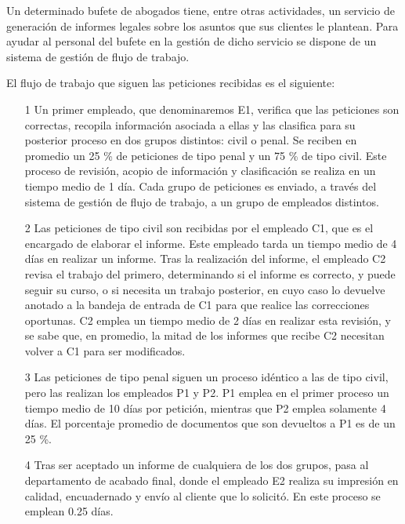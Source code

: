 \begin{problem}[21]
Un determinado bufete de abogados tiene, entre otras actividades, un servicio de generación de informes legales sobre los asuntos que sus clientes le plantean. Para ayudar al personal del bufete en la gestión de dicho servicio se dispone de un sistema de gestión de flujo de trabajo.

El flujo de trabajo que siguen las peticiones recibidas es el siguiente:
\begin{enumerate}
\item[1] Un primer empleado, que denominaremos E1, verifica que las peticiones son correctas, recopila información asociada a ellas y las clasifica para su posterior proceso en dos grupos distintos: civil o penal. Se reciben en promedio un 25 \% de peticiones de tipo penal y un 75 \% de tipo civil. Este proceso de revisión, acopio de información y clasificación se realiza en un tiempo medio de 1 día. Cada grupo de peticiones es enviado, a través del sistema de gestión de flujo de trabajo, a un grupo de empleados distintos.

\item[2] Las peticiones de tipo civil son recibidas por el empleado C1, que es el encargado de elaborar el informe. Este empleado tarda un tiempo medio de 4 días en realizar un informe. Tras la realización del informe, el empleado C2 revisa el trabajo del primero, determinando si el informe es correcto, y puede seguir su curso, o si necesita un trabajo posterior, en cuyo caso lo devuelve anotado a la bandeja de entrada de C1 para que realice las correcciones oportunas. C2 emplea un tiempo medio de 2 días en realizar esta revisión, y se sabe que, en promedio, la mitad de los informes que recibe C2 necesitan volver a C1 para ser modificados.

\item[3] Las peticiones de tipo penal siguen un proceso idéntico a las de tipo civil, pero las realizan los empleados P1 y P2. P1 emplea en el primer proceso un tiempo medio de 10 días por petición, mientras que P2 emplea solamente 4 días. El porcentaje promedio de documentos que son devueltos a P1 es de un 25 \%.

\item[4] Tras ser aceptado un informe de cualquiera de los dos grupos, pasa al departamento de acabado final, donde el empleado E2 realiza su impresión en calidad, encuadernado y envío al cliente que lo solicitó. En este proceso se emplean 0.25 días.
\end{enumerate}


\end{problem}
